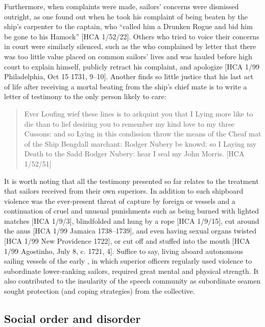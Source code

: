 Furthermore, when complaints were made, sailors’ concerns were dismissed outright, as one  found out when he took his complaint of being beaten by the ship’s carpenter to the captain, who “called him a Drunken Rogue and bid him be gone to his Hamock” [HCA 1/52/22]. Others who tried to voice their concerns in court were similarly silenced, such as the  who complained by letter that there was too little value placed on common sailors’ lives and was hauled before high court to explain himself, publicly retract his complaint, and apologize [HCA 1/99 Philadelphia, Oct 15 1731, 9–10]. Another  finds so little justice that his last act of life after receiving a mortal beating from the ship’s chief mate is to write a letter of testimony to the only person likely to care:

\begin{quotation}
Ever Loufing wief these lines is to arkquint you that I Lying more like to die than to lief desiring you to remember my kind love to my three Cussons: and so Lying in this condission throw the means of the Cheaf mat of the Ship Bengdall marchant: Rodger Nubery be knowd: so I Laying my Death to the Sadd Rodger Nubery: hear I seal my John Morris. [HCA 1/52/51] \end{quotation}

It is worth noting that all the testimony presented so far relates to the treatment that sailors received from their own superiors. In addition to such shipboard violence was the ever-present threat of capture by foreign or  vessels and a continuation of cruel and unusual punishments such as being burned with lighted matches [HCA 1/9/3], blindfolded and hung by a rope [HCA 1/9/15], cut around the anus [HCA 1/99 Jamaica {1738}–1739], and even having sexual organs twisted [HCA 1/99 New  Providence 1722], or cut off and stuffed into the mouth [HCA 1/99 Agostinho, July 8, c. 1721, 4]. Suffice to say, living aboard autonomous sailing vessels of the early , in which superior officers regularly used violence to subordinate lower-ranking sailors, required great mental and physical strength. It also contributed to the insularity of the speech community as subordinate seamen sought protection (and coping strategies) from the collective.

\subsection{{Social order and disorder}}\label{sec:4.2.3}

